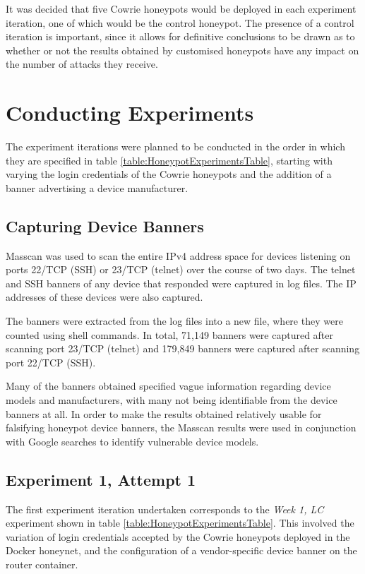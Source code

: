 It was decided that five Cowrie honeypots would be deployed in each experiment iteration, one of which would be the control honeypot. The presence of a control iteration is important, since it allows for definitive conclusions to be drawn as to whether or not the results obtained by customised honeypots have any impact on the number of attacks they receive. 


 
%
%
 

 \section{Conducting Experiments} \label{ConductingExperiments}
The experiment iterations were planned to be conducted in the order in which they are specified in table \ref{table:HoneypotExperimentsTable}, starting with varying the login credentials of the Cowrie honeypots and the addition of a banner advertising a device manufacturer.


\subsection{Capturing Device Banners}
Masscan was used to scan the entire IPv4 address space for devices listening on ports 22/TCP (SSH) or 23/TCP (telnet) over the course of two days. The telnet and SSH banners of any device that responded were captured in log files. The IP addresses of these devices were also captured.

The banners were extracted from the log files into a new file, where they were counted using shell commands. In total, 71,149 banners were captured after scanning port 23/TCP (telnet) and 179,849 banners were captured after scanning port 22/TCP (SSH). 

Many of the banners obtained specified vague information regarding device models and manufacturers, with many not being identifiable from the device banners at all. In order to make the results obtained relatively usable for falsifying honeypot device banners, the Masscan results were used in conjunction with Google searches to identify vulnerable device models.

\subsection{Experiment 1, Attempt 1}
The first experiment iteration undertaken corresponds to the \textit{Week 1, LC} experiment shown in table \ref{table:HoneypotExperimentsTable}. This involved the variation of login credentials accepted by the Cowrie honeypots deployed in the Docker honeynet, and the configuration of a vendor-specific device banner on the router container.


